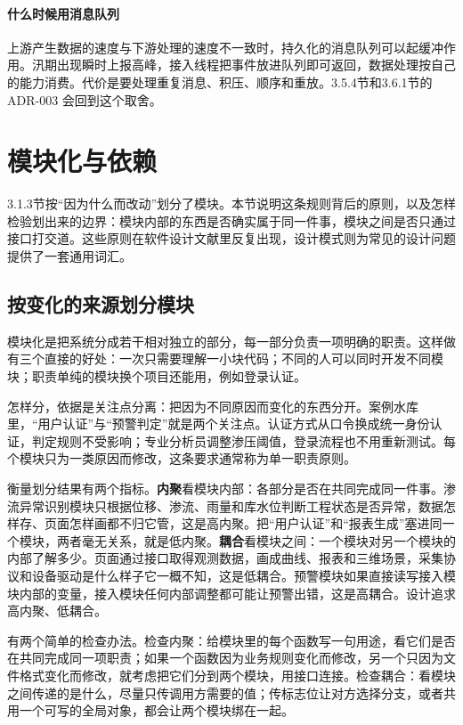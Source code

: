 \paragraph{什么时候用消息队列}上游产生数据的速度与下游处理的速度不一致时，持久化的消息队列可以起缓冲作用。汛期出现瞬时上报高峰，接入线程把事件放进队列即可返回，数据处理按自己的能力消费。代价是要处理重复消息、积压、顺序和重放。3.5.4节和3.6.1节的 ADR-003 会回到这个取舍。

\section{模块化与依赖}\label{sec:ch03-modularity}


3.1.3节按“因为什么而改动”划分了模块。本节说明这条规则背后的原则，以及怎样检验划出来的边界：模块内部的东西是否确实属于同一件事，模块之间是否只通过接口打交道。这些原则在软件设计文献里反复出现，设计模式则为常见的设计问题提供了一套通用词汇\cite{martin2017,gamma1994}。

\subsection{按变化的来源划分模块}

模块化是把系统分成若干相对独立的部分，每一部分负责一项明确的职责。这样做有三个直接的好处：一次只需要理解一小块代码；不同的人可以同时开发不同模块；职责单纯的模块换个项目还能用，例如登录认证。

怎样分，依据是关注点分离：把因为不同原因而变化的东西分开。案例水库里，“用户认证”与“预警判定”就是两个关注点。认证方式从口令换成统一身份认证，判定规则不受影响；专业分析员调整渗压阈值，登录流程也不用重新测试。每个模块只为一类原因而修改，这条要求通常称为单一职责原则。

衡量划分结果有两个指标。\textbf{内聚}看模块内部：各部分是否在共同完成同一件事。渗流异常识别模块只根据位移、渗流、雨量和库水位判断工程状态是否异常，数据怎样存、页面怎样画都不归它管，这是高内聚。把“用户认证”和“报表生成”塞进同一个模块，两者毫无关系，就是低内聚。\textbf{耦合}看模块之间：一个模块对另一个模块的内部了解多少。页面通过接口取得观测数据，画成曲线、报表和三维场景，采集协议和设备驱动是什么样子它一概不知，这是低耦合。预警模块如果直接读写接入模块内部的变量，接入模块任何内部调整都可能让预警出错，这是高耦合。设计追求高内聚、低耦合。

有两个简单的检查办法。检查内聚：给模块里的每个函数写一句用途，看它们是否在共同完成同一项职责；如果一个函数因为业务规则变化而修改，另一个只因为文件格式变化而修改，就考虑把它们分到两个模块，用接口连接。检查耦合：看模块之间传递的是什么，尽量只传调用方需要的值；传标志位让对方选择分支，或者共用一个可写的全局对象，都会让两个模块绑在一起。


